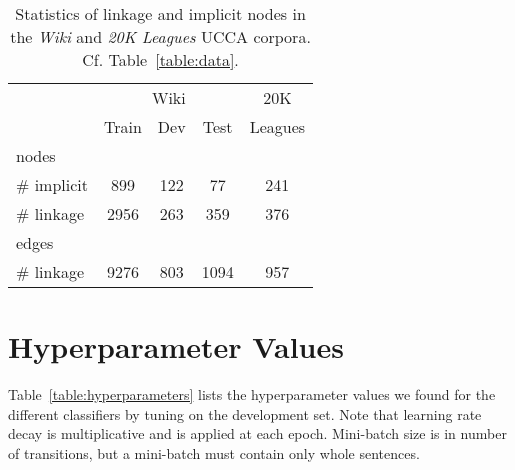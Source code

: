 \documentclass[11pt,a4paper]{article}
\newcommand{\tabref}[1]{Table~\ref{#1}}
\begin{document}
\begin{table}[ht]
\centering
\begin{tabular}{l|ccc|c}
& \multicolumn{3}{c|}{Wiki} & 20K \\
& \small Train & \small Dev & \small Test & Leagues \\
\hline
nodes \\
\# implicit & 899 & 122 & 77 & 241 \\
\# linkage & 2956 & 263 & 359 & 376 \\
\hline
edges \\
\# linkage & 9276 & 803 & 1094 & 957
\end{tabular}
\caption{Statistics of linkage and implicit nodes in the
\textit{Wiki} and \textit{20K Leagues} UCCA corpora.
Cf. \tabref{table:data}.
}
\label{table:data_linkage_implicit}
\end{table}

\section{Hyperparameter Values}
\label{appendix:hyperparameters}

\tabref{table:hyperparameters} lists the hyperparameter values we found
for the different classifiers by tuning on the development set.
Note that learning rate decay is multiplicative and is applied at each epoch.
Mini-batch size is in number of transitions,
but a mini-batch must contain only whole sentences.
\end{document}
